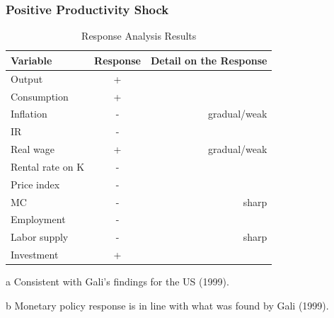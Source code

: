 \documentclass{article}
\begin{document}
\subsubsection{Positive Productivity Shock}

\begin{table}[H]    
    \centering  
    \begin{threeparttable}    
    \caption{Response Analysis Results}    
    \label{tab:response_analysis}    
    \begin{tabular}{lcr}    
        \toprule    
        \textbf{Variable} & \textbf{Response} & \textbf{Detail on the Response} \\    
        \midrule    
        Output & + &  \\    
        Consumption & + &  \\  
        Inflation & - & gradual/weak\\  
        IR\tnote{b} & - &  \\   
        Real wage & + & gradual/weak \\  
        Rental rate on K & - & \\
        Price index & - & \\
        MC & - & sharp \\ 
        Employment\tnote{a} & - &  \\    
        Labor supply & - & sharp \\
        Investment & + & \\   
        \bottomrule    
    \end{tabular}  
    \begin{tablenotes}  
        \small  
        \item[a] Consistent with Gali's findings for the US (1999).  
        \item[b] Monetary policy response is in line with what was found by Gali (1999).  
    \end{tablenotes}  
    \end{threeparttable}    
\end{table} 
\end{document}

